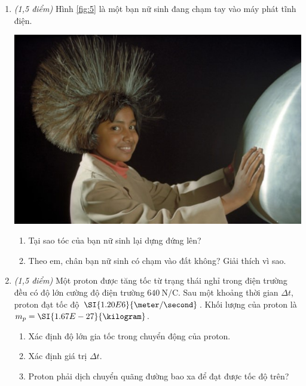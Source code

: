 \begin{enumerate}[label=\bfseries Câu \arabic*:]
	\item \textit{(1,5 điểm)} Hình \ref{fig:5} là một bạn nữ sinh đang chạm tay vào máy phát tĩnh điện.
	\begin{center}
		\includegraphics[width=0.35\linewidth]{../figs/PH11-MidSem2-05-5}
		\label{fig:5}
	\end{center}
	\begin{enumerate}[label=\alph*)]
		\item Tại sao tóc của bạn nữ sinh lại dựng đứng lên?
		\item Theo em, chân bạn nữ sinh có chạm vào đất không? Giải thích vì sao.
	\end{enumerate}
	\item \textit{(1,5 điểm)} Một proton được tăng tốc từ trạng thái nghỉ trong điện trường đều có độ lớn cường độ điện trường $\SI{640}{\newton/\coulomb}$. Sau một khoảng thời gian $\Delta t$, proton đạt tốc độ $\SI{1.20E6}{\meter/\second}$. Khối lượng của proton là $m_p=\SI{1.67E-27}{\kilogram}$.
	\begin{enumerate}[label=\alph*)]
		\item Xác định độ lớn gia tốc trong chuyển động của proton.
		\item Xác định giá trị $\Delta t$.
		\item Proton phải dịch chuyển quãng đường bao xa để đạt được tốc độ trên?
	\end{enumerate}


\end{enumerate}
